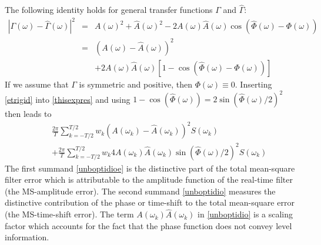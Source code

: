 \documentclass[11pt]{article}
\begin{document}
The following identity holds for general transfer functions $\Gamma$ and $\hat{\Gamma}$:
\begin{eqnarray}
|\Gamma(\omega)-\hat{\Gamma}(\omega)|^2&=&A(\omega)^2+\hat{A}(\omega)^2-2A(\omega)
\hat{A}(\omega)\cos\left(\hat{\Phi}(\omega)-\Phi(\omega)\right)\nonumber\\
&=&
(A(\omega)-\hat{A}(\omega))^2\nonumber\\
&&+2A(\omega)\hat{A}(\omega)\left[1-\cos\left(\hat{\Phi}(\omega)-\Phi(\omega)\right)\right]\label{etrigid}
\end{eqnarray}
If we assume that $\Gamma$ is symmetric and positive, then \(\Phi(\omega)\equiv
0\). Inserting \ref{etrigid} into \ref{thisexpres} and using $1-\cos(\hat{\Phi}(\omega))=2\sin(\hat{\Phi}(\omega)/2)^2$ then leads to
\begin{eqnarray} &&\frac{2\pi}{ T} \sum_{k=-T/2}^{T/2}w_k
(A(\omega_k)-\hat{A}(\omega_k))^2 S(\omega_k)\label{unboptidioe}\\
&&+\frac{2\pi}{ T} \sum_{k=-T/2}^{T/2}w_k
4A(\omega_k)\hat{A}(\omega_k)\sin(\hat{\Phi}(\omega)/2)^2
S(\omega_k)\label{unboptidio}
\end{eqnarray}
The first summand \ref{unboptidioe} is the distinctive part of the total mean-square filter error which is attributable to the amplitude function of the real-time filter (the MS-amplitude error). The second summand \ref{unboptidio} measures the distinctive contribution of the phase or time-shift to the total mean-square error (the MS-time-shift error). The term
$A(\omega_k)\hat{A}(\omega_k)$ in \ref{unboptidio} is a scaling factor which accounts for the fact that the phase function does not convey level information. \\
\end{document}
